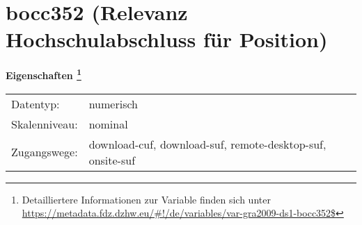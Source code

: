 
    \setcounter{footnote}{0}

    \vspace*{-1.8cm}
	\section{bocc352 (Relevanz Hochschulabschluss für Position)}
	\label{section:bocc352}



    \vspace*{0.5cm}
    \noindent\textbf{Eigenschaften
	\footnote{Detailliertere Informationen zur Variable finden sich unter
		\url{https://metadata.fdz.dzhw.eu/\#!/de/variables/var-gra2009-ds1-bocc352$}}}\\
	\begin{tabularx}{\hsize}{@{}lX}
	Datentyp: & numerisch \\
	Skalenniveau: & nominal \\
	Zugangswege: &
	  download-cuf, 
	  download-suf, 
	  remote-desktop-suf, 
	  onsite-suf
 \\
    \end{tabularx}



